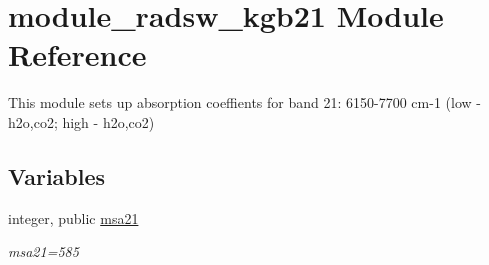 \hypertarget{namespacemodule__radsw__kgb21}{}\section{module\+\_\+radsw\+\_\+kgb21 Module Reference}
\label{namespacemodule__radsw__kgb21}


This module sets up absorption coeffients for band 21\+: 6150-\/7700 cm-\/1 (low -\/ h2o,co2; high -\/ h2o,co2)  


\subsection*{Variables}
\begin{DoxyCompactItemize}
\item 
\mbox{\label{namespacemodule__radsw__kgb21_a235b17e9b4b37668028c572f80e1188a}} 
integer, public \hyperlink{namespacemodule__radsw__kgb21_a235b17e9b4b37668028c572f80e1188a}{msa21}
\begin{DoxyCompactList}\small\item\em msa21=585 \end{DoxyCompactList}\end{DoxyCompactItemize}
